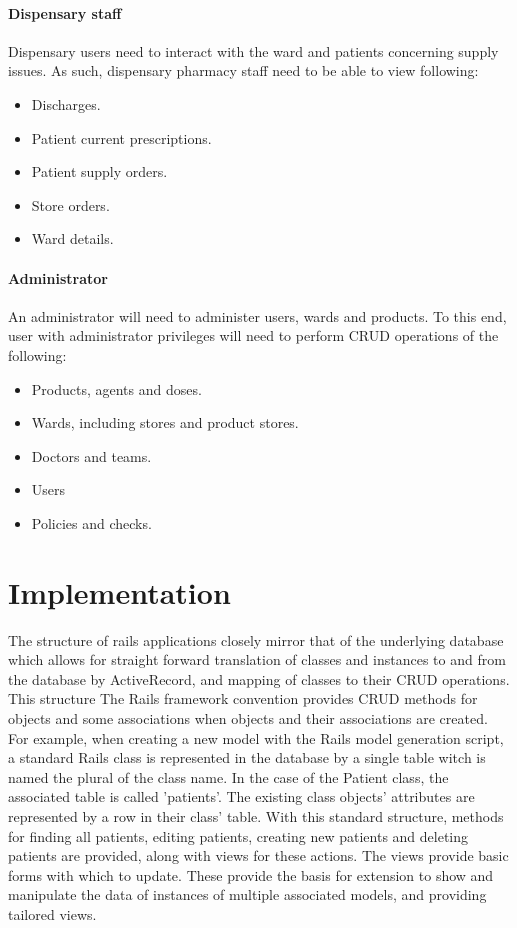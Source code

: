 \documentclass[letterpaper]{amsart}
\begin{document}
\subsection{Dispensary staff}
Dispensary users need to interact with the ward and patients concerning supply issues.  As such, dispensary pharmacy staff need to be able to view following:
\begin{itemize} 
    \item Discharges.
    \item Patient current prescriptions.
    \item Patient supply orders.
    \item Store orders.
    \item Ward details. 
\end{itemize}

\subsection{Administrator}
An administrator will need to administer users, wards and products.  To this end, user with administrator privileges will need to perform CRUD operations of the following:
\begin{itemize}
    \item Products, agents and doses.
    \item Wards, including stores and product stores.
    \item Doctors and teams.
    \item Users
    \item Policies and checks.
\end{itemize}

\part{Implementation}
The structure of rails applications closely mirror that of the underlying database which allows for straight forward translation of classes and instances to and from the database by ActiveRecord, and mapping of classes to their CRUD operations.   This structure
The Rails framework convention provides CRUD methods for objects and some associations when objects and their associations are created.  For example, when creating a new model with the Rails model generation script, a standard Rails class is represented in the database by a single table witch is named the plural of the class name.  In the case of the Patient class, the associated table is called 'patients'.  The existing class objects' attributes are represented by a row in their class' table.  With this standard structure, methods for finding all patients, editing patients, creating new patients and deleting patients are provided, along with views for these actions.  The views provide basic forms with which to update.  These provide the basis for extension to show and manipulate the data of instances of multiple associated models, and providing tailored views. 
\end{document}
